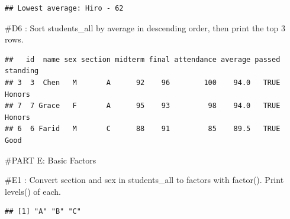 \documentclass[
]{article}
\newenvironment{Shaded}{\begin{snugshade}}{\end{snugshade}}
\newcommand{\AttributeTok}[1]{\textcolor[rgb]{0.13,0.29,0.53}{#1}}
\newcommand{\ConstantTok}[1]{\textcolor[rgb]{0.56,0.35,0.01}{#1}}
\newcommand{\DecValTok}[1]{\textcolor[rgb]{0.00,0.00,0.81}{#1}}
\newcommand{\FunctionTok}[1]{\textcolor[rgb]{0.13,0.29,0.53}{\textbf{#1}}}
\newcommand{\NormalTok}[1]{#1}
\newcommand{\OtherTok}[1]{\textcolor[rgb]{0.56,0.35,0.01}{#1}}
\newcommand{\SpecialCharTok}[1]{\textcolor[rgb]{0.81,0.36,0.00}{\textbf{#1}}}
\begin{document}
\begin{verbatim}
## Lowest average: Hiro - 62
\end{verbatim}

\#D6 : Sort students\_all by average in descending order, then print the
top 3 rows.

\begin{Shaded}
\end{Shaded}

\begin{verbatim}
##   id  name sex section midterm final attendance average passed standing
## 3  3  Chen   M       A      92    96        100    94.0   TRUE   Honors
## 7  7 Grace   F       A      95    93         98    94.0   TRUE   Honors
## 6  6 Farid   M       C      88    91         85    89.5   TRUE     Good
\end{verbatim}

\#PART E: Basic Factors

\#E1 : Convert section and sex in students\_all to factors with
factor(). Print levels() of each.

\begin{Shaded}
\end{Shaded}

\begin{verbatim}
## [1] "A" "B" "C"
\end{verbatim}

\begin{Shaded}
\end{Shaded}
\end{document}
